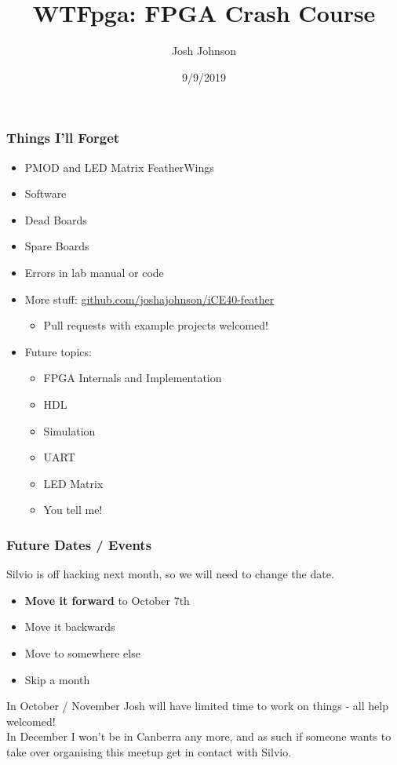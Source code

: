 \documentclass[t]{beamer}
\title[WTFpga]{WTFpga: FPGA Crash Course} %
\author{Josh Johnson} %
\institute[] %
{ \\ %
\medskip
\textit{} %
}
\date{9/9/2019} %
\begin{document}
\begin{frame}
\titlepage %
\end{frame}


\begin{frame}
\frametitle{Things I'll Forget}
\begin{itemize}
	\item PMOD and LED Matrix FeatherWings 
	\item Software
	\item Dead Boards
	\item Spare Boards
	\item Errors in lab manual or code
	\item More stuff: \url{github.com/joshajohnson/iCE40-feather}
	\begin{itemize}
		\item Pull requests with example projects welcomed!
	\end{itemize}
	\item Future topics:
	\begin{itemize}
		\item FPGA Internals and Implementation
		\item HDL 
		\item Simulation
		\item UART
		\item LED Matrix
		\item You tell me!
	\end{itemize}
\end{itemize}
\end{frame}


\begin{frame}
\frametitle{Future Dates / Events}
Silvio is off hacking next month, so we will need to change the date.
\begin{itemize}
	\item \textbf{Move it forward} to October 7th
	\item Move it backwards
	\item Move to somewhere else
	\item Skip a month
\end{itemize}

\vspace{5mm}
In October / November Josh will have limited time to work on things - all help welcomed!\\


In December I won't be in Canberra any more, and as such if someone wants to take over organising this meetup get in contact with Silvio.
\end{frame}
\end{document}
